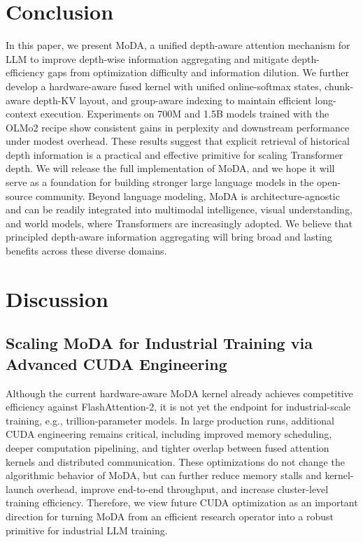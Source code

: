 \documentclass[]{bytedance_seed}
\newcommand{\name}{MoDA}
\begin{document}
\section{Conclusion}
In this paper, we present \name{}, a unified depth-aware attention mechanism for LLM to improve depth-wise information aggregating and mitigate depth-efficiency gaps from optimization difficulty and information dilution. 
We further develop a hardware-aware fused kernel with unified online-softmax states, chunk-aware depth-KV layout, and group-aware indexing to maintain efficient long-context execution. 
Experiments on 700M and 1.5B models trained with the OLMo2 recipe show consistent gains in perplexity and downstream performance under modest overhead. 
These results suggest that explicit retrieval of historical depth information is a practical and effective primitive for scaling Transformer depth.
We will release the full implementation of \name{}, and we hope it will serve as a foundation for building stronger large language models in the open-source community.
Beyond language modeling, \name{} is architecture-agnostic and can be readily integrated into multimodal intelligence, visual understanding, and world models, where Transformers are increasingly adopted.
We believe that principled depth-aware information aggregating will bring broad and lasting benefits across these diverse domains.

\section{Discussion}

\subsection{Scaling MoDA for Industrial Training via Advanced CUDA Engineering}
Although the current hardware-aware \name{} kernel already achieves competitive efficiency against FlashAttention-2, 
it is not yet the endpoint for industrial-scale training, e.g., trillion-parameter models. 
In large production runs, additional CUDA engineering remains critical, including improved memory scheduling, deeper computation pipelining, and tighter overlap between fused attention kernels and distributed communication. 
These optimizations do not change the algorithmic behavior of \name{}, but can further reduce memory stalls and kernel-launch overhead, improve end-to-end throughput, and increase cluster-level training efficiency. 
Therefore, we view future CUDA optimization as an important direction for turning \name{} from an efficient research operator into a robust primitive for industrial LLM training.
\end{document}
